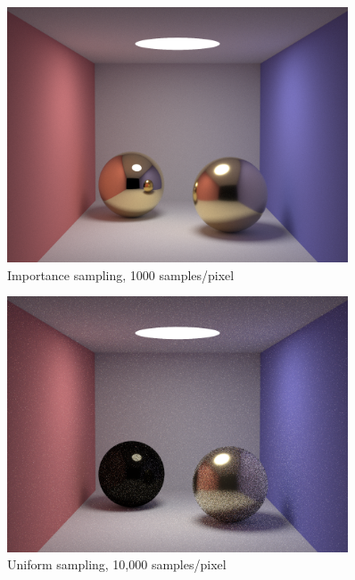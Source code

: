 \documentclass[10pt]{beamer}
\begin{document}
\begin{frame}
	\begin{figure}[H]
  \centering
    \includegraphics[width=0.9\textwidth]{convergedIS.png}
    \caption{Importance sampling, 1000 samples/pixel}
\end{figure}
\end{frame}

\begin{frame}
	\begin{figure}[H]
  \centering
    \includegraphics[width=0.9\textwidth]{10KDS.png}
    \caption{Uniform sampling, 10,000 samples/pixel}
\end{figure}
\end{frame}
\end{document}
